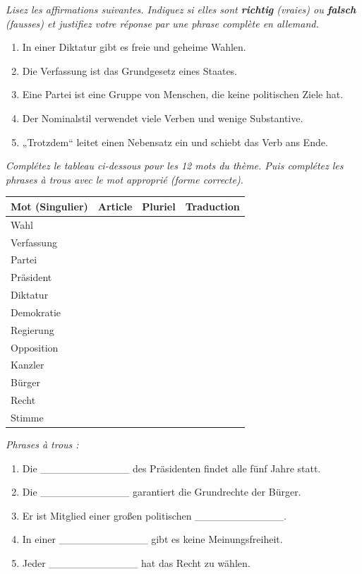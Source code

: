 \documentclass[11pt]{article}
\begin{document}
\begin{exercice}
\emph{Lisez les affirmations suivantes. Indiquez si elles sont \textbf{richtig} (vraies) ou \textbf{falsch} (fausses) et justifiez votre réponse par une phrase complète en allemand.}
\begin{enumerate}
    \item In einer Diktatur gibt es freie und geheime Wahlen.
    \item Die Verfassung ist das Grundgesetz eines Staates.
    \item Eine Partei ist eine Gruppe von Menschen, die keine politischen Ziele hat.
    \item Der Nominalstil verwendet viele Verben und wenige Substantive.
    \item „Trotzdem“ leitet einen Nebensatz ein und schiebt das Verb ans Ende.
\end{enumerate}
\end{exercice}

\begin{exercice}
\emph{Complétez le tableau ci-dessous pour les 12 mots du thème. Puis complétez les phrases à trous avec le mot approprié (forme correcte).}

\begin{center}
\begin{tabularx}{\linewidth}{|X|X|X|X|}
\hline
\rowcolor{popblueL} \textbf{Mot (Singulier)} & \textbf{Article} & \textbf{Pluriel} & \textbf{Traduction} \\ \hline
Wahl & & & \\ \hline
Verfassung & & & \\ \hline
Partei & & & \\ \hline
Präsident & & & \\ \hline
Diktatur & & & \\ \hline
Demokratie & & & \\ \hline
Regierung & & & \\ \hline
Opposition & & & \\ \hline
Kanzler & & & \\ \hline
Bürger & & & \\ \hline
Recht & & & \\ \hline
Stimme & & & \\ \hline
\end{tabularx}
\end{center}

\medskip
\emph{Phrases à trous :}
\begin{enumerate}
    \item Die \_\_\_\_\_\_\_\_\_\_\_\_ des Präsidenten findet alle fünf Jahre statt.
    \item Die \_\_\_\_\_\_\_\_\_\_\_\_ garantiert die Grundrechte der Bürger.
    \item Er ist Mitglied einer großen politischen \_\_\_\_\_\_\_\_\_\_\_\_.
    \item In einer \_\_\_\_\_\_\_\_\_\_\_\_ gibt es keine Meinungsfreiheit.
    \item Jeder \_\_\_\_\_\_\_\_\_\_\_\_ hat das Recht zu wählen.
\end{enumerate}
\end{exercice}
\end{document}
